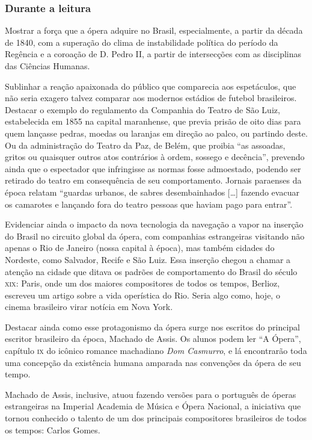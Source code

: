 \documentclass[11pt]{extarticle}
\begin{document}
\subsubsection{Durante a leitura}

Mostrar a força que a ópera adquire no Brasil, especialmente, a partir da
década de 1840, com a superação do clima de instabilidade política do período
da Regência e a coroação de D. Pedro II, a partir de intersecções com as disciplinas 
das Ciências Humanas.

Sublinhar a reação apaixonada do público que comparecia aos espetáculos, que
não seria exagero talvez comparar aos modernos estádios de futebol brasileiros.
Destacar o exemplo do regulamento da Companhia do Teatro de São Luiz,
estabelecida em 1855 na capital maranhense, que previa prisão de oito dias para
quem lançasse pedras, moedas ou laranjas em direção ao palco, ou partindo
deste. Ou da administração do Teatro da Paz, de Belém, que proibia ``as
assoadas, gritos ou quaisquer outros atos contrários à ordem, sossego e
decência'', prevendo ainda que o espectador que infringisse as normas fosse
admoestado, podendo ser retirado do teatro em consequência de seu
comportamento. Jornais paraenses da época relatam “guardas urbanos, de sabres
desembainhados […] fazendo evacuar os camarotes e lançando fora do teatro
pessoas que haviam pago para entrar”.

Evidenciar ainda o impacto da nova tecnologia da navegação a vapor na inserção
do Brasil no circuito global da ópera, com companhias estrangeiras visitando
não apenas o Rio de Janeiro (nossa capital à época), mas também cidades do
Nordeste, como Salvador, Recife e São Luiz. Essa inserção chegou a chamar a
atenção na cidade que ditava os padrões de comportamento do Brasil do século
\textsc{xix}: Paris, onde um dos maiores compositores de todos os tempos, Berlioz,
escreveu um artigo sobre a vida operística do Rio. Seria algo como, hoje, o
cinema brasileiro virar notícia em Nova York.

Destacar ainda como esse protagonismo da ópera surge nos escritos do principal
escritor brasileiro da época, Machado de Assis. Os alunos podem ler ``A Ópera'',
capítulo \textsc{ix} do icônico romance machadiano \emph{Dom Casmurro}, e lá encontrarão toda
uma concepção da existência humana amparada nas convenções da ópera de seu
tempo.

Machado de Assis, inclusive, atuou fazendo versões para o português de óperas
estrangeiras na Imperial Academia de Música e Ópera Nacional, a iniciativa que
tornou conhecido o talento de um dos principais compositores brasileiros de
todos os tempos: Carlos Gomes.
\end{document}
